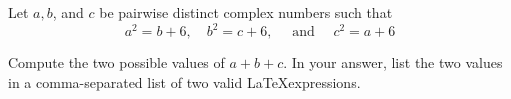 Let $a, b$, and $c$ be pairwise distinct complex numbers such that
$$
a^{2}=b+6, \quad b^{2}=c+6, \quad \text { and } \quad c^{2}=a+6
$$

Compute the two possible values of $a+b+c$. In your answer, list the two values in a comma-separated list of two valid \LaTeX expressions.